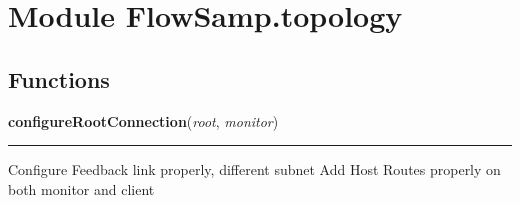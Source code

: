 %
%
%


\section{Module FlowSamp.topology}

    \label{FlowSamp:topology}


  \subsection{Functions}

    \label{FlowSamp:topology:configureRootConnection}

    \vspace{0.5ex}

\hspace{.8\funcindent}\begin{boxedminipage}{\funcwidth}

    \raggedright \textbf{configureRootConnection}(\textit{root}, \textit{monitor})

    \vspace{-1.5ex}

    \rule{\textwidth}{0.5\fboxrule}
\setlength{\parskip}{2ex}
    Configure Feedback link properly, different subnet Add Host Routes 
    properly on both monitor and client

\setlength{\parskip}{1ex}
    \end{boxedminipage}



